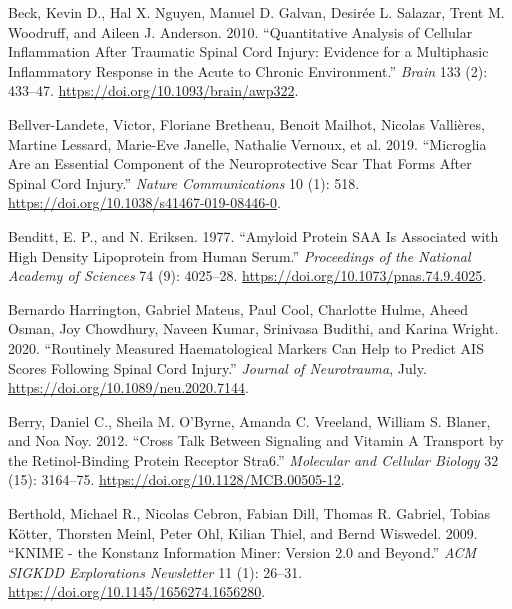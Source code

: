 \documentclass[9pt,lineno]{elife}
\newlength{\cslhangindent}
\newlength{\cslentryspacingunit} %
\newenvironment{CSLReferences}[2] %
 {%
  \setlength{\parindent}{0pt}
  \ifodd #1
  \let\oldpar\par
  \def\par{\hangindent=\cslhangindent\oldpar}
  \fi
  \setlength{\parskip}{#2\cslentryspacingunit}
 }%
 {}
\begin{document}
\begin{CSLReferences}{1}{0}
\leavevmode{}%
Beck, Kevin D., Hal X. Nguyen, Manuel D. Galvan, Desirée L. Salazar, Trent M. Woodruff, and Aileen J. Anderson. 2010. {``Quantitative Analysis of Cellular Inflammation After Traumatic Spinal Cord Injury: Evidence for a Multiphasic Inflammatory Response in the Acute to Chronic Environment.''} \emph{Brain} 133 (2): 433--47. \url{https://doi.org/10.1093/brain/awp322}.

\leavevmode{}%
Bellver-Landete, Victor, Floriane Bretheau, Benoit Mailhot, Nicolas Vallières, Martine Lessard, Marie-Eve Janelle, Nathalie Vernoux, et al. 2019. {``Microglia Are an Essential Component of the Neuroprotective Scar That Forms After Spinal Cord Injury.''} \emph{Nature Communications} 10 (1): 518. \url{https://doi.org/10.1038/s41467-019-08446-0}.

\leavevmode{}%
Benditt, E. P., and N. Eriksen. 1977. {``Amyloid Protein {SAA} Is Associated with High Density Lipoprotein from Human Serum.''} \emph{Proceedings of the National Academy of Sciences} 74 (9): 4025--28. \url{https://doi.org/10.1073/pnas.74.9.4025}.

\leavevmode{}%
Bernardo Harrington, Gabriel Mateus, Paul Cool, Charlotte Hulme, Aheed Osman, Joy Chowdhury, Naveen Kumar, Srinivasa Budithi, and Karina Wright. 2020. {``Routinely Measured Haematological Markers Can Help to Predict {AIS} Scores Following Spinal Cord Injury.''} \emph{Journal of Neurotrauma}, July. \url{https://doi.org/10.1089/neu.2020.7144}.

\leavevmode{}%
Berry, Daniel C., Sheila M. O'Byrne, Amanda C. Vreeland, William S. Blaner, and Noa Noy. 2012. {``Cross {Talk} Between {Signaling} and {Vitamin A Transport} by the {Retinol-Binding Protein Receptor Stra6}.''} \emph{Molecular and Cellular Biology} 32 (15): 3164--75. \url{https://doi.org/10.1128/MCB.00505-12}.

\leavevmode{}%
Berthold, Michael R., Nicolas Cebron, Fabian Dill, Thomas R. Gabriel, Tobias Kötter, Thorsten Meinl, Peter Ohl, Kilian Thiel, and Bernd Wiswedel. 2009. {``{KNIME} - the {Konstanz} Information Miner: Version 2.0 and Beyond.''} \emph{ACM SIGKDD Explorations Newsletter} 11 (1): 26--31. \url{https://doi.org/10.1145/1656274.1656280}.


\end{CSLReferences}
\end{document}
